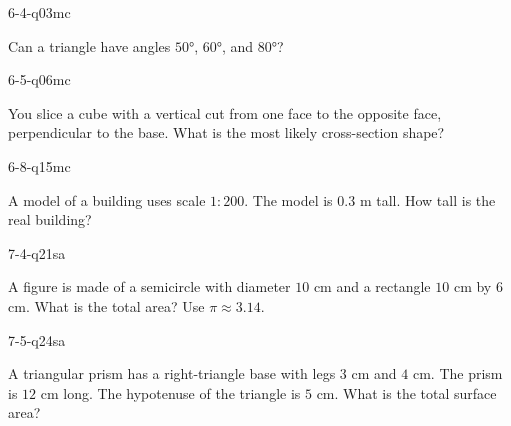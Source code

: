 \begin{practiceQuestion}{6-4-q03}{mc}
\begin{questionText}
Can a triangle have angles $50°$, $60°$, and $80°$?
\end{questionText}
\end{practiceQuestion}

\begin{practiceQuestion}{6-5-q06}{mc}
\begin{questionText}
You slice a cube with a vertical cut from one face to the opposite face, perpendicular to the base. What is the most likely cross-section shape?
\end{questionText}
\end{practiceQuestion}

\begin{practiceQuestion}{6-8-q15}{mc}
\begin{questionText}
A model of a building uses scale $1:200$. The model is $0.3$ m tall. How tall is the real building?
\end{questionText}
\end{practiceQuestion}

\begin{practiceQuestion}{7-4-q21}{sa}
\begin{questionText}
A figure is made of a semicircle with diameter $10$ cm and a rectangle $10$ cm by $6$ cm. What is the total area? Use $\pi \approx 3.14$.
\end{questionText}
\end{practiceQuestion}

\begin{practiceQuestion}{7-5-q24}{sa}
\begin{questionText}
A triangular prism has a right-triangle base with legs $3$ cm and $4$ cm. The prism is $12$ cm long. The hypotenuse of the triangle is $5$ cm. What is the total surface area?
\end{questionText}
\end{practiceQuestion}

